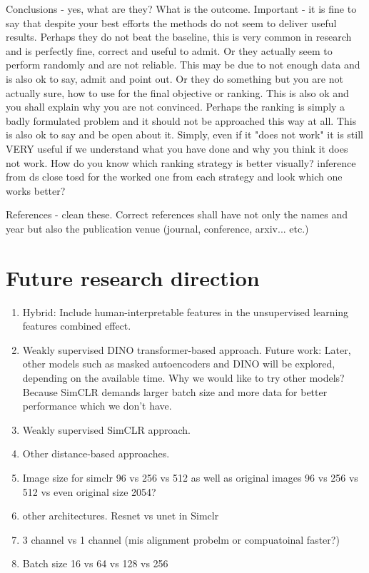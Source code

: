 	Conclusions - yes, what are they? What is the outcome. Important - it is fine to say that despite your best efforts the methods do not seem to
	 deliver useful results. Perhaps they do not beat the baseline, this is very common in research and is perfectly fine, correct and useful to admit.
	  Or they actually seem to perform randomly and are not reliable. This may be due to not enough data and is also ok to say, admit and point out. Or 
	  they do something but you are not actually sure, how to use for the final objective or ranking. This is also ok and you shall explain why you are 
	  not convinced. Perhaps the ranking is simply a badly formulated problem and it should not be approached this way at all. This is also ok to say and 
	  be open about it. Simply, even if it "does not work" it is still VERY useful if we understand what you have done and why you think it does not work.	
How do you know which ranking strategy is better visually? inference from ds close tosd for the worked one from each strategy and look which one works 
better?

References - clean these. Correct references shall have not only the names and year but also the publication venue (journal, conference, arxiv... etc.)

\section{Future research direction}

\begin{enumerate}
    \item Hybrid: Include human-interpretable features in the unsupervised learning features combined effect.
    \item Weakly supervised DINO transformer-based approach. Future work: Later, other models such as masked autoencoders and DINO will be explored, depending on the available time.
	Why we would like to try other models? Because SimCLR demands larger batch size and more data for better performance which we don't have.
    \item Weakly supervised SimCLR approach.
    \item Other distance-based approaches.
    \item Image size for simclr 96 vs 256 vs 512 as well as original images 96 vs 256 vs 512 vs even original size 2054?
    \item other architectures. Resnet vs unet in Simclr
    \item 3 channel vs 1 channel (mis alignment probelm or compuatoinal faster?)
    \item Batch size 16 vs 64 vs 128 vs 256

\end{enumerate}